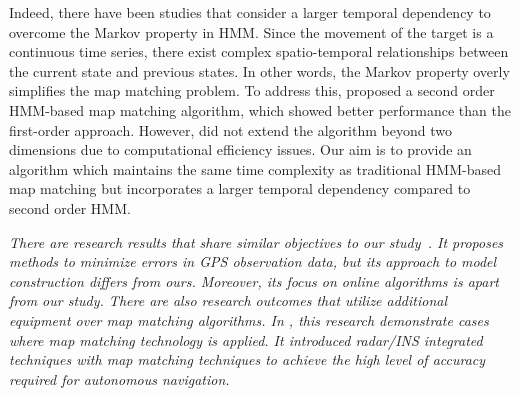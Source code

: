 \documentclass[preprint,12pt]{elsarticle}
\begin{document}
Indeed, there have been studies that consider a larger temporal dependency to overcome the Markov property in HMM. Since the movement of the target is a continuous time series, there exist complex spatio-temporal relationships between the current state and previous states. In other words, the Markov property overly simplifies the map matching problem. To address this, \cite{fu2021online} proposed a second order HMM-based map matching algorithm, which showed better performance than the first-order approach. However, \cite{fu2021online} did not extend the algorithm beyond two dimensions due to computational efficiency issues. Our aim is to provide an algorithm which maintains the same time complexity as traditional HMM-based map matching but incorporates a larger temporal dependency compared to second order HMM.

\emph{There are research results that share similar objectives to our study~\cite{hu2023amm}. It proposes methods to minimize errors in GPS observation data, but its approach to model construction differs from ours. Moreover, its focus on online algorithms is apart from our study.
	There are also research outcomes that utilize additional equipment over map matching algorithms.
	 In \cite{elkholy2023radar}, this research demonstrate cases where map matching technology is applied. It introduced radar/INS integrated techniques with map matching techniques to achieve the high level of accuracy required for autonomous navigation.}
	
\end{document}

